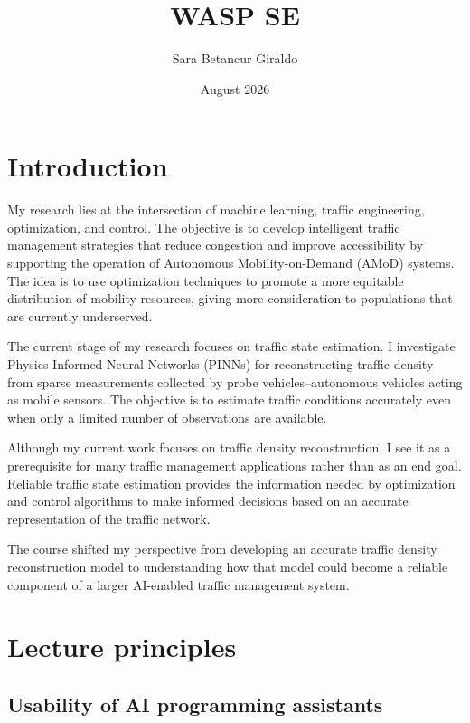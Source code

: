\documentclass{article}
\title{WASP SE}
\author{Sara Betancur Giraldo}
\date{August 2026}
\begin{document}
\maketitle

\section{Introduction}
My research lies at the intersection of machine learning, traffic engineering, optimization, and control.
The objective is to develop intelligent traffic management strategies that reduce congestion and improve accessibility by supporting the operation of Autonomous Mobility-on-Demand (AMoD) systems. 
The idea is to use optimization techniques to promote a more equitable distribution of mobility resources, giving more consideration to populations that are currently underserved.

The current stage of my research focuses on traffic state estimation. 
I investigate Physics-Informed Neural Networks (PINNs) for reconstructing traffic density from sparse measurements collected by probe vehicles--autonomous vehicles acting as mobile sensors. 
The objective is to estimate traffic conditions accurately even when only a limited number of observations are available. 

Although my current work focuses on traffic density reconstruction, I see it as a prerequisite for many traffic management applications rather than as an end goal. 
Reliable traffic state estimation provides the information needed by optimization and control algorithms to make informed decisions based on an accurate representation of the traffic network. 

The course shifted my perspective from developing an accurate traffic density reconstruction model to understanding how that model could become a reliable component of a larger AI-enabled traffic management system.

\section{Lecture principles}
\subsection{Usability of AI programming assistants}
\end{document}
